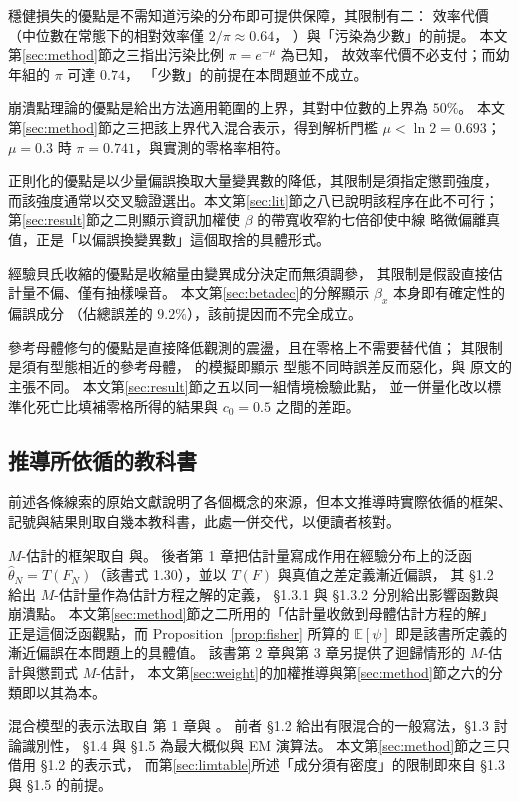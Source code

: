 \documentclass[UTF8, fontset=macnew, a4paper, 12pt]{ctexart}
\newcommand{\Ex}{\mathbb{E}}
\begin{document}
穩健損失的優點是不需知道污染的分布即可提供保障，其限制有二：
效率代價（中位數在常態下的相對效率僅 $2/\pi\approx0.64$，
\citealp{huber2009}）與「污染為少數」的前提。
本文第\ref{sec:method}節之三指出污染比例 $\pi=e^{-\mu}$ 為已知，
故效率代價不必支付；而幼年組的 $\pi$ 可達 $0.74$，
「少數」的前提在本問題並不成立。

崩潰點理論的優點是給出方法適用範圍的上界，其對中位數的上界為 $50\%$。
本文第\ref{sec:method}節之三把該上界代入混合表示，得到解析門檻
$\mu<\ln 2=0.693$；$\mu=0.3$ 時 $\pi=0.741$，與實測的零格率相符。

正則化的優點是以少量偏誤換取大量變異數的降低，其限制是須指定懲罰強度，
而該強度通常以交叉驗證選出。本文第\ref{sec:lit}節之八已說明該程序在此不可行；
第\ref{sec:result}節之二則顯示資訊加權使 $\beta$ 的帶寬收窄約七倍卻使中線
略微偏離真值，正是「以偏誤換變異數」這個取捨的具體形式。

經驗貝氏收縮的優點是收縮量由變異成分決定而無須調參，
其限制是假設直接估計量不偏、僅有抽樣噪音。
本文第\ref{sec:betadec}的分解顯示 $\hat\beta_x$ 本身即有確定性的偏誤成分
（佔總誤差的 $9.2\%$），該前提因而不完全成立。

參考母體修勻的優點是直接降低觀測的震盪，且在零格上不需要替代值；
其限制是須有型態相近的參考母體，\citet{yue2019} 的模擬即顯示
型態不同時誤差反而惡化，與 \citet{lee2003} 原文的主張不同。
本文第\ref{sec:result}節之五以同一組情境檢驗此點，
並一併量化改以標準化死亡比填補零格所得的結果與 $c_0=0.5$ 之間的差距。

\subsection{推導所依循的教科書}\label{sec:books}

前述各條線索的原始文獻說明了各個概念的來源，但本文推導時實際依循的框架、
記號與結果則取自幾本教科書，此處一併交代，以便讀者核對。

$M$-估計的框架取自 \citet{huber2009} 與\citet{zoubir2018}。
後者第 1 章把估計量寫成作用在經驗分布上的泛函
$\hat\theta_N=T(F_N)$（該書式 1.30），並以 $T(F)$ 與真值之差定義漸近偏誤，
其 §1.2 給出 $M$-估計量作為估計方程之解的定義，
§1.3.1 與 §1.3.2 分別給出影響函數與崩潰點。
本文第\ref{sec:method}節之二所用的「估計量收斂到母體估計方程的解」
正是這個泛函觀點，而 Proposition~\ref{prop:fisher} 所算的
$\Ex[\psi]$ 即是該書所定義的漸近偏誤在本問題上的具體值。
該書第 2 章與第 3 章另提供了迴歸情形的 $M$-估計與懲罰式 $M$-估計，
本文第\ref{sec:weight}的加權推導與第\ref{sec:method}節之六的分類即以其為本。

混合模型的表示法取自 \citet{yao2024} 第 1 章與 \citet{mclachlan2000}。
前者 §1.2 給出有限混合的一般寫法，§1.3 討論識別性，
§1.4 與 §1.5 為最大概似與 EM 演算法。
本文第\ref{sec:method}節之三只借用 §1.2 的表示式，
而第\ref{sec:limtable}所述「成分須有密度」的限制即來自 §1.3 與 §1.5 的前提。
\end{document}
